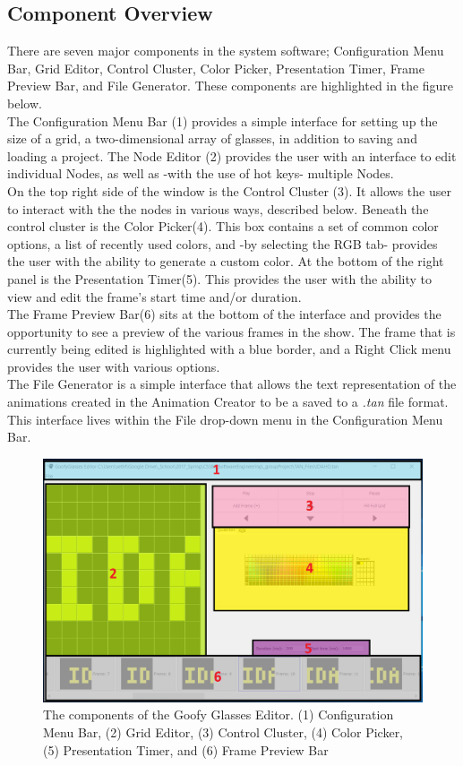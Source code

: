 \documentclass[12pt]{article}
\begin{document}
	\subsection {Component Overview}
    There are seven major components in the system software; Configuration Menu Bar, Grid Editor, Control Cluster, Color Picker, Presentation Timer, Frame Preview Bar, and File Generator. These components are highlighted in the figure below.
    \\
    The Configuration Menu Bar (1) provides a simple interface for setting up the size of a grid, a two-dimensional array of glasses, in addition to saving and loading a project. The Node Editor (2) provides the user with an interface to edit individual Nodes, as well as -with the use of hot keys- multiple Nodes. 
    \\
    On the top right side of the window is the Control Cluster (3). It allows the user to interact with the the nodes in various ways, described below. Beneath the control cluster is the Color Picker(4). This box contains a set of common color options, a list of recently used colors, and -by selecting the RGB tab- provides the user with the ability to generate a custom color. At the bottom of the right panel is the Presentation Timer(5). This provides the user with the ability to view and edit the frame's start time and/or duration. 
    \\
    The Frame Preview Bar(6) sits at the bottom of the interface and provides the opportunity to see a preview of the various frames in the show. The frame that is currently being edited is highlighted with a blue border, and a Right Click menu provides the user with various options. 
    \\
    The File Generator is a simple interface that allows the text representation of the animations created in the Animation Creator to be a saved to a \textit{.tan} file format. This interface lives within the File drop-down menu in the Configuration Menu Bar. 
   
  \begin{figure}[h]
    \centering
    \includegraphics[width=\linewidth]{editor.png}
    \caption{
      The components of the Goofy Glasses Editor. (1) Configuration Menu Bar, (2) Grid Editor, (3) Control Cluster, (4) Color Picker, (5) Presentation Timer, and (6) Frame Preview Bar
    }
  \end{figure}
\end{document}
